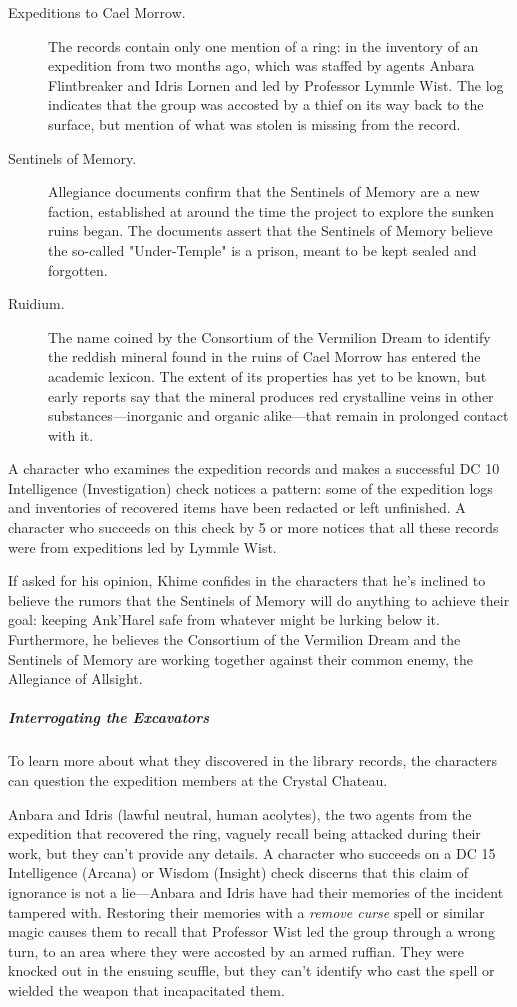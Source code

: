 \documentclass[10pt,a4paper,twoside,bg=print,twocolumn,openany,nodeprecatedcode]{dndbook}
\begin{document}
\begin{description}
\item[Expeditions to Cael Morrow.]
The records contain only one mention of a ring: in the inventory of an expedition from two months ago, which was staffed by agents Anbara Flintbreaker and Idris Lornen and led by Professor Lymmle Wist. The log indicates that the group was accosted by a thief on its way back to the surface, but mention of what was stolen is missing from the record.
\item[Sentinels of Memory.]
Allegiance documents confirm that the Sentinels of Memory are a new faction, established at around the time the project to explore the sunken ruins began. The documents assert that the Sentinels of Memory believe the so-called "Under-Temple" is a prison, meant to be kept sealed and forgotten.
\item[Ruidium.]
The name coined by the Consortium of the Vermilion Dream to identify the reddish mineral found in the ruins of Cael Morrow has entered the academic lexicon. The extent of its properties has yet to be known, but early reports say that the mineral produces red crystalline veins in other substances—inorganic and organic alike—that remain in prolonged contact with it.
\end{description}

A character who examines the expedition records and makes a successful DC 10 Intelligence (Investigation) check notices a pattern: some of the expedition logs and inventories of recovered items have been redacted or left unfinished. A character who succeeds on this check by 5 or more notices that all these records were from expeditions led by Lymmle Wist.

If asked for his opinion, Khime confides in the characters that he's inclined to believe the rumors that the Sentinels of Memory will do anything to achieve their goal: keeping Ank'Harel safe from whatever might be lurking below it. Furthermore, he believes the Consortium of the Vermilion Dream and the Sentinels of Memory are working together against their common enemy, the Allegiance of Allsight.

\subparagraph{Interrogating the Excavators}
To learn more about what they discovered in the library records, the characters can question the expedition members at the Crystal Chateau.

Anbara and Idris (lawful neutral, human acolytes), the two agents from the expedition that recovered the ring, vaguely recall being attacked during their work, but they can't provide any details. A character who succeeds on a DC 15 Intelligence (Arcana) or Wisdom (Insight) check discerns that this claim of ignorance is not a lie—Anbara and Idris have had their memories of the incident tampered with. Restoring their memories with a \textit{remove curse} spell or similar magic causes them to recall that Professor Wist led the group through a wrong turn, to an area where they were accosted by an armed ruffian. They were knocked out in the ensuing scuffle, but they can't identify who cast the spell or wielded the weapon that incapacitated them.
\end{document}
